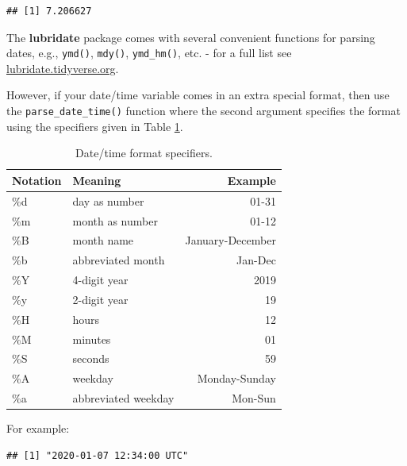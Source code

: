 \documentclass[
  12pt,
  krantz2]{krantz}
\makeatletter
\newenvironment{Shaded}{\begin{snugshade}}{\end{snugshade}}
\newcommand{\KeywordTok}[1]{\textcolor[rgb]{0.13,0.29,0.53}{\textbf{#1}}}
\newcommand{\NormalTok}[1]{#1}
\newcommand{\StringTok}[1]{\textcolor[rgb]{0.31,0.60,0.02}{#1}}
\newenvironment{kframe}{%
\medskip{}
\setlength{\fboxsep}{.8em}
 \def\at@end@of@kframe{}%
 \ifinner\ifhmode%
  \def\at@end@of@kframe{\end{minipage}}%
  \begin{minipage}{\columnwidth}%
 \fi\fi%
 \def\FrameCommand##1{\hskip\@totalleftmargin \hskip-\fboxsep
 \colorbox{shadecolor}{##1}\hskip-\fboxsep
     \hskip-\linewidth \hskip-\@totalleftmargin \hskip\columnwidth}%
 \MakeFramed {\advance\hsize-\width
   \@totalleftmargin\z@ \linewidth\hsize
   \@setminipage}}%
 {\par\unskip\endMakeFramed%
 \at@end@of@kframe}
\renewenvironment{Shaded}{\begin{kframe}}{\end{kframe}}
\makeatother
\begin{document}
\begin{verbatim}
## [1] 7.206627
\end{verbatim}

The \textbf{lubridate} package comes with several convenient functions for parsing dates, e.g., \texttt{ymd()}, \texttt{mdy()}, \texttt{ymd\_hm()}, etc. - for a full list see \url{lubridate.tidyverse.org}.

However, if your date/time variable comes in an extra special format, then use the \texttt{parse\_date\_time()} function where the second argument specifies the format using the specifiers given in Table \ref{tab:chap2-tab-timehelpers}.

\begin{table}[!h]

\caption{\label{tab:chap2-tab-timehelpers}Date/time format specifiers.}
\centering
\fontsize{9}{11}\selectfont
\begin{tabular}[t]{llr}
\toprule
Notation & Meaning & Example\\
\midrule
\%d & day as number & 01-31\\
\%m & month as number & 01-12\\
\%B & month name & January-December\\
\%b & abbreviated month & Jan-Dec\\
\%Y & 4-digit year & 2019\\
\%y & 2-digit year & 19\\
\%H & hours & 12\\
\%M & minutes & 01\\
\%S & seconds & 59\\
\%A & weekday & Monday-Sunday\\
\%a & abbreviated weekday & Mon-Sun\\
\bottomrule
\end{tabular}
\end{table}

For example:

\begin{Shaded}
\end{Shaded}

\begin{verbatim}
## [1] "2020-01-07 12:34:00 UTC"
\end{verbatim}
\end{document}
